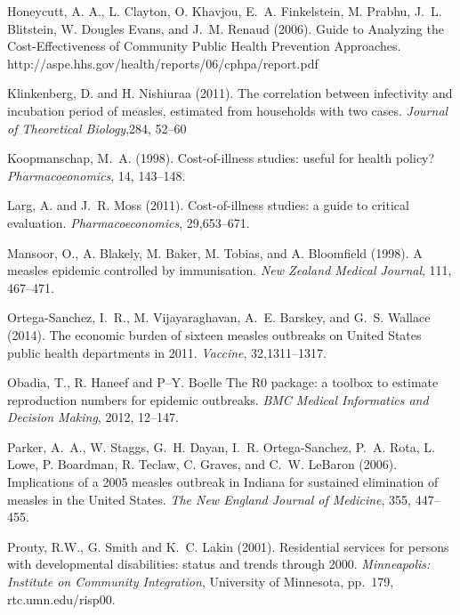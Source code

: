 \documentclass{article}
\begin{document}
\begin{thebibliography}{}
Honeycutt, A. A., L. Clayton, O. Khavjou, E.~A. Finkelstein, M. Prabhu, J.~L. Blitstein, W. Dougles Evans, and J.~M. Renaud (2006).
\newblock Guide to Analyzing the Cost-Effectiveness of Community Public Health Prevention Approaches.
http://aspe.hhs.gov/health/reports/06/cphpa/report.pdf

Klinkenberg, D. and H. Nishiuraa (2011).
\newblock The correlation between infectivity and incubation period of measles, estimated from households with two cases.
\newblock \emph{Journal of Theoretical Biology},284, 52--60

Koopmanschap, M.~A. (1998).
\newblock Cost-of-illness studies: useful for health policy?
\newblock \emph{Pharmacoeonomics}, 14, 143--148.

Larg, A. and J.~R. Moss (2011).
\newblock Cost-of-illness studies: a guide to critical evaluation.
\newblock \emph{Pharmacoeconomics}, 29,653--671.

Mansoor, O., A. Blakely, M. Baker, M. Tobias, and A. Bloomfield (1998).
\newblock A measles epidemic controlled by immunisation. 
\newblock \emph{New Zealand Medical Journal}, 111, 467--471.

Ortega-Sanchez, I.~R., M. Vijayaraghavan, A.~E. Barskey, and G.~S. Wallace (2014).
\newblock The economic burden of sixteen measles outbreaks on United States public health departments in 2011.
\newblock \emph{Vaccine}, 32,1311--1317.

Obadia, T., R. Haneef and P--Y. Boelle
\newblock The R0 package: a toolbox to estimate reproduction numbers for epidemic outbreaks.
\newblock \emph{BMC Medical Informatics and Decision Making}, 2012, 12--147.

Parker, A.~A., W. Staggs, G.~H. Dayan, I.~R. Ortega-Sanchez, P.~A. Rota, L. Lowe, P. Boardman, R. Teclaw, C. Graves, and C.~W. LeBaron (2006).
\newblock Implications of a 2005 measles outbreak in Indiana for sustained elimination of measles in the United States.
\newblock \emph{The New England Journal of Medicine}, 355, 447--455.

Prouty, R.W., G. Smith and K.~C. Lakin (2001).
\newblock Residential services for persons with developmental disabilities: status and trends through 2000.
\newblock \emph{Minneapolis: Institute on Community Integration}, University of Minnesota, pp.~179, rtc.umn.edu/risp00.


\end{thebibliography}
\end{document}
